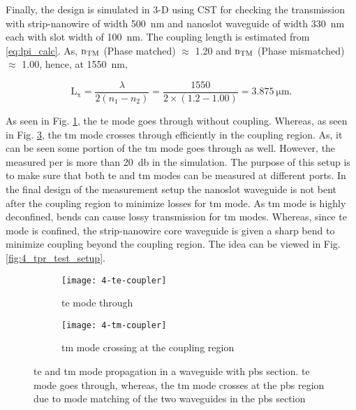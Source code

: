 \documentclass[../report.tex]{subfiles}
\begin{document}
\noindent Finally, the design is simulated in 3-D using CST for checking the transmission with strip-nanowire of width \SI{500}{\nano \meter} and nanoslot waveguide of width \SI{330}{\nano \meter} each with slot width of \SI{100}{\nano \meter}. The coupling length is estimated from \ref{eq:lpi_calc}. As, $\mathrm{n_{TM}}$ (Phase matched) $\approx$ 1.20 and $\mathrm{n_{TM}}$ (Phase mismatched) $\approx$ 1.00, hence, at \SI{1550}{\nano \meter},

\begin{equation}\label{eq:lpi_calc_mc}
\mathrm{L_\pi} = \dfrac {\lambda} {2(n_1 - n_2)} = \dfrac {1550} {2\times(1.2 - 1.00)} = \SI{3.875}{\micro \meter}.
\end{equation} 

\noindent As seen in Fig. \ref{fig:4_te_coupler}, the \gls{te} mode goes through without coupling. Whereas, as seen in Fig. \ref{fig:4_tm_coupler}, the \gls{tm} mode crosses through efficiently in the coupling region. As, it can be seen some portion of the \gls{tm} mode goes through as well. However, the measured \gls{per} is more than \SI{20}{\decibel} in the simulation. The purpose of this setup is to make sure that both \gls{te} and \gls{tm} modes can be measured at different ports. In the final design of the measurement setup the nanoslot waveguide is not bent after the coupling region to minimize losses for \gls{tm} mode. As \gls{tm} mode is highly deconfined, bends can cause lossy transmission for \gls{tm} modes. Whereas, since \gls{te} mode is confined, the strip-nanowire core waveguide is given a sharp bend to minimize coupling beyond the coupling region. The idea can be viewed in Fig. \ref{fig:4_tpr_test_setup}.

\begin{figure}[H] %
	\begin{subfigure}[t]{0.45\textwidth}
		\texttt{[image: 4-te-coupler]}
		\caption{\gls{te} mode through}
		\label{fig:4_te_coupler}
	\end{subfigure}
	\hfill
	\begin{subfigure}[t]{0.45\textwidth}
		\texttt{[image: 4-tm-coupler]}
		\caption{\gls{tm} mode crossing at the coupling region}
		\label{fig:4_tm_coupler}
	\end{subfigure}
	\caption{\gls{te} and \gls{tm} mode propagation in a waveguide with \gls{pbs} section. \gls{te} mode goes through, whereas, the \gls{tm} mode crosses at the \gls{pbs} region due to mode matching of the two waveguides in the \gls{pbs} section}
\end{figure}
\end{document}
